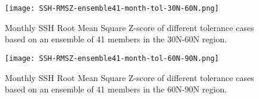 \documentclass{sig-alternate}
\begin{document}
\begin{figure}
\begin{center}
\texttt{[image: SSH-RMSZ-ensemble41-month-tol-30N-60N.png]}
\end{center}
\caption[] {Monthly SSH Root Mean Square Z-score of different tolerance cases based on an ensemble of 41 members in the 30N-60N region.}
\label{fig:ssh_rmsz_30n}
\end{figure}

\begin{figure}
\begin{center}
\texttt{[image: SSH-RMSZ-ensemble41-month-tol-60N-90N.png]}
\end{center}
\caption[] {Monthly SSH Root Mean Square Z-score of different tolerance cases based on an ensemble of 41 members in the 60N-90N region.}
\label{fig:ssh_rmsz_60n}
\end{figure}
\end{document}
